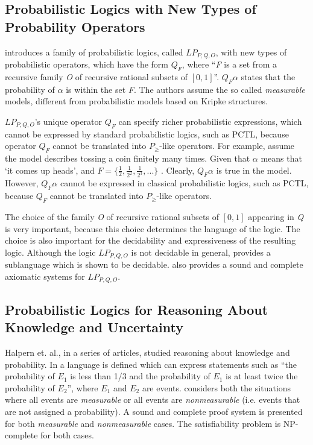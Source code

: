 \documentclass[11pt]{article}
\begin{document}
\subsection{Probabilistic Logics with New Types of Probability Operators}

\cite{OR99} introduces a family of probabilistic logics, called $LP_{P,Q,O}$,  with new types of probabilistic operators, which have the form $Q_{F}$, where ``\emph{F} is a set from a recursive family \emph{O} of recursive rational subsets of $[0,1]$''. $Q_{F}\alpha$ states that the probability of $\alpha$ is within the set \emph{F}. The authors assume the so called \emph{measurable} models, different from probabilistic models based on Kripke structures.  

$LP_{P,Q,O}$'s unique operator $Q_{F}$ can specify richer probabilistic expressions, which cannot be expressed by standard probabilistic logics, such as PCTL, because operator $Q_{F}$ cannot be translated into $P_{\geq}$-like operators. For example, assume the model describes tossing a coin finitely many times. Given that $\alpha$ means that `it comes up heads', and $F = \{\frac{1}{2},\frac{1}{2^{2}},\frac{1}{2^{3}},...\}$ \cite{OR99}. Clearly, $Q_{F}\alpha$ is true in the model. However, $Q_{F}\alpha$ cannot be expressed in classical probabilistic logics, such as PCTL, because $Q_{F}$ cannot be translated into $P_{\geq}$-like operators. 

The choice of the family \emph{O} of recursive rational subsets of $[0,1]$ appearing in \emph{Q} is very important, because this choice determines the language of the logic. The choice is also important for the decidability and expressiveness of  the resulting logic. Although the logic $LP_{P,Q,O}$ is not decidable in general, \cite{OR99}  provides a sublanguage which is shown to be decidable. \cite{OR99} also provides a sound and complete axiomatic systems for $LP_{P,Q,O}$.


\subsection{Probabilistic Logics for Reasoning About Knowledge and Uncertainty}



Halpern et. al., in a series of articles, studied reasoning about knowledge and probability.  In \cite{FHM90} a language is defined which can express statements such as ``the probability of $E_{1}$ is less than 1/3 and the probability of $E_{1}$ is at least twice the probability of $E_{2}$'', where $E_{1}$ and $E_{2}$ are events. \cite{FHM90} considers both the situations where all events are \emph{measurable} or  all events are \emph{nonmeasurable} (i.e. events that are not assigned a probability). A sound and complete proof system is presented for both \emph{measurable} and \emph{nonmeasurable} cases. The satisfiability problem is NP-complete for both cases. 
\end{document}
